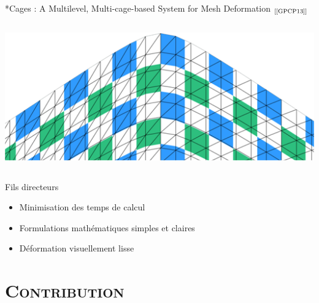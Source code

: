 \documentclass[xcolor=x11names,compress]{beamer}
\renewcommand{\(}{\begin{columns}} \renewcommand{\)}{\end{columns}}
\newcommand{\<}[1]{\begin{column}{#1}} \renewcommand{\>}{\end{column}}
\begin{document}
\begin{frame}{*Cages : A Multilevel, Multi-cage-based System for Mesh Deformation 
  $_{[\text{\cite{GPCP13}}]}$}
\begin{columns}[t]
\begin{column}{0.3\textwidth}
{\begin{minipage}{0.87\textwidth}
        \includegraphics[scale=0.15]{starCages-Boite-Avec-Pres}
      \end{minipage}}
    \end{column}
  \end{columns}
\end{frame}

\begin{frame}{Fils directeurs}
  \begin{itemize}
    \item Minimisation des temps de calcul
    \item Formulations mathématiques simples et claires
    \item Déformation visuellement lisse
  \end{itemize}
\end{frame}


\section{\scshape Contribution}
\end{document}
